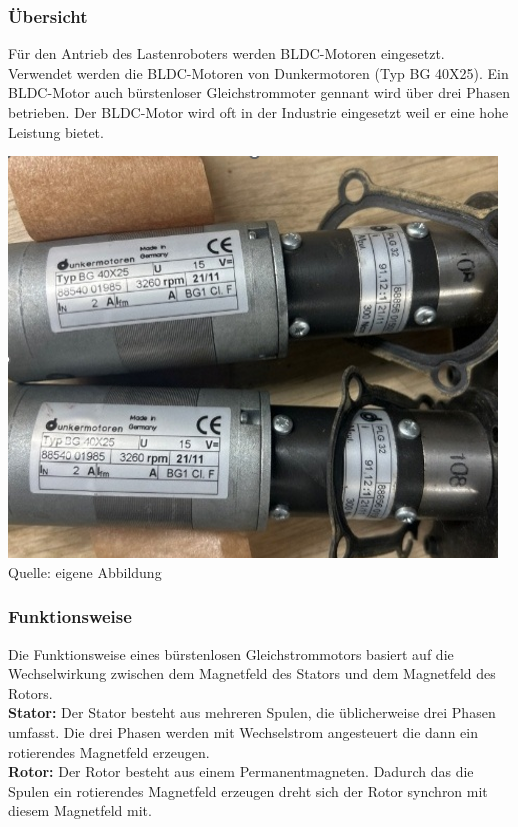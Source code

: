 \documentclass[ngerman,12pt,a4paper]{article}
\begin{document}
			\subsubsection{Übersicht}
			Für den Antrieb des Lastenroboters werden BLDC-Motoren eingesetzt. Verwendet werden die BLDC-Motoren von Dunkermotoren (Typ BG 40X25). Ein BLDC-Motor auch bürstenloser Gleichstrommoter gennant wird über drei Phasen betrieben. Der BLDC-Motor wird oft in der Industrie eingesetzt weil er eine hohe Leistung bietet.
			
			\begin{center}
				\begin{minipage}{\textwidth}
					\centering
					\includegraphics[scale=0.5]{Pictures/Motoren}
					\label{fig:spiffs_init}
					\vspace{-2pt}
					{\small Quelle: eigene Abbildung}
				\end{minipage}
			\end{center}
			
			\subsubsection{Funktionsweise}
			Die Funktionsweise eines bürstenlosen Gleichstrommotors basiert auf die Wechselwirkung zwischen dem Magnetfeld des Stators und dem Magnetfeld des Rotors.\\[0.5cm]
			\textbf{Stator:} Der Stator besteht aus mehreren Spulen, die üblicherweise drei Phasen umfasst. Die drei Phasen werden mit Wechselstrom angesteuert die dann ein rotierendes Magnetfeld erzeugen.\\[0.5cm]
			\textbf{Rotor:} Der Rotor besteht aus einem Permanentmagneten. Dadurch das die Spulen ein rotierendes Magnetfeld erzeugen dreht sich der Rotor synchron mit diesem Magnetfeld mit.
			
\end{document}
